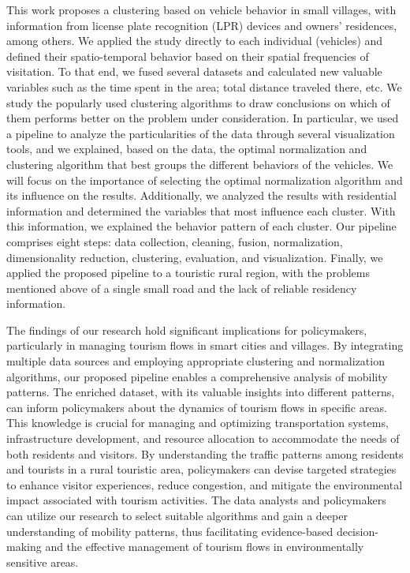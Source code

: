 This work proposes a clustering based on vehicle behavior in small villages, with information from license plate recognition (LPR) devices and owners' residences, among others. We applied the study directly to each individual (vehicles) and defined their spatio-temporal behavior based on their spatial frequencies of visitation. To that end, we fused several datasets and calculated new valuable variables such as the time spent in the area; total distance traveled there, etc. We study the popularly used clustering algorithms to draw conclusions on which of them performs better on the problem under consideration. In particular, we used a pipeline to analyze the particularities of the data through several visualization tools, and we explained, based on the data, the optimal normalization and clustering algorithm that best groups the different behaviors of the vehicles. We will focus on the importance of selecting the optimal normalization algorithm and its influence on the results. Additionally, we analyzed the results with residential information and determined the variables that most influence each cluster. With this information, we explained the behavior pattern of each cluster. Our pipeline comprises eight steps: data collection, cleaning, fusion, normalization, dimensionality reduction, clustering, evaluation, and visualization. Finally, we applied the proposed pipeline to a touristic rural region, with the problems mentioned above of a single small road and the lack of reliable residency information.

The findings of our research hold significant implications for policymakers, particularly in managing tourism flows in smart cities and villages. By integrating multiple data sources and employing appropriate clustering and normalization algorithms, our proposed pipeline enables a comprehensive analysis of mobility patterns. The enriched dataset, with its valuable insights into different patterns, can inform policymakers about the dynamics of tourism flows in specific areas. This knowledge is crucial for managing and optimizing transportation systems, infrastructure development, and resource allocation to accommodate the needs of both residents and visitors. By understanding the traffic patterns among residents and tourists in a rural touristic area, policymakers can devise targeted strategies to enhance visitor experiences, reduce congestion, and mitigate the environmental impact associated with tourism activities. The data analysts and policymakers can utilize our research to select suitable algorithms and gain a deeper understanding of mobility patterns, thus facilitating evidence-based decision-making and the effective management of tourism flows in environmentally sensitive areas.

